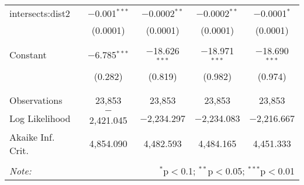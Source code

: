 \begin{table}[!htbp]
\begin{tabular}{@{\extracolsep{-5pt}}lcccc}
 intersects:dist2 & $-$0.001$^{***}$ & $-$0.0002$^{**}$ & $-$0.0002$^{**}$ & $-$0.0001$^{*}$ \\ 
  & (0.0001) & (0.0001) & (0.0001) & (0.0001) \\ 
  & & & & \\ 
 Constant & $-$6.785$^{***}$ & $-$18.626$^{***}$ & $-$18.971$^{***}$ & $-$18.690$^{***}$ \\ 
  & (0.282) & (0.819) & (0.982) & (0.974) \\ 
  & & & & \\ 
\hline \\[-1.8ex] 
Observations & 23,853 & 23,853 & 23,853 & 23,853 \\ 
Log Likelihood & $-$2,421.045 & $-$2,234.297 & $-$2,234.083 & $-$2,216.667 \\ 
Akaike Inf. Crit. & 4,854.090 & 4,482.593 & 4,484.165 & 4,451.333 \\ 
\hline 
\hline \\[-1.8ex] 
\textit{Note:}  & \multicolumn{4}{r}{$^{*}$p$<$0.1; $^{**}$p$<$0.05; $^{***}$p$<$0.01} \\ 
\end{tabular} 
\end{table} 
